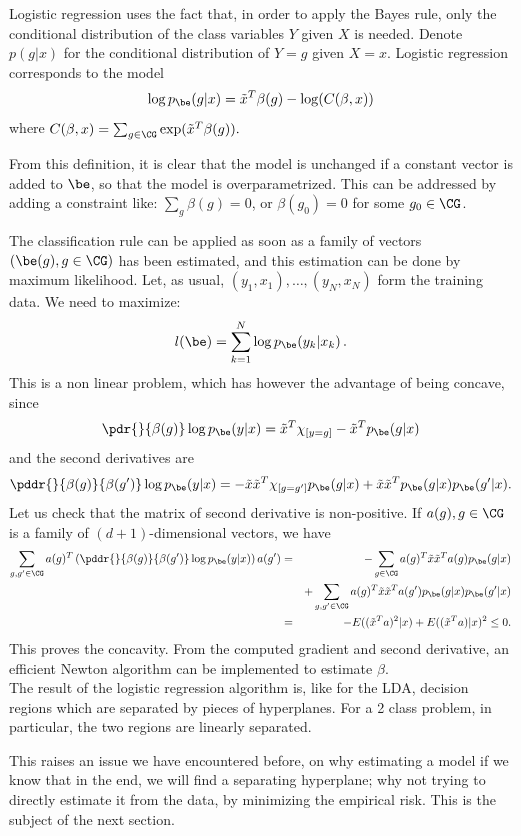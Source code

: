Logistic regression uses the fact that, in order to apply the Bayes
rule, only the conditional distribution of the class variables $Y$
given $X$ is needed. Denote $p(g|x)$ for the conditional distribution
of $Y=g$ given $X=x$. Logistic regression corresponds to the model
$$
\log p_\be(g|x) = \tilde x^T \beta(g) - \log(C(\beta, x))
$$
where
$C(\beta, x) = \sum_{g\in \CG} \exp(\tilde x^T \beta(g)).$

From this definition, it is clear that the model is unchanged  if a constant vector is added
to $\be$, so that the model is overparametrized. This can be addressed
by adding a constraint like: $\sum_g
\beta(g) = 0$, or $\beta(g_0) = 0$ for some $g_0\in \CG$.

The classification rule can be applied as soon as a family of vectors $(\be(g),
g\in\CG)$ has been estimated, and this estimation can be done by maximum
likelihood. Let, as usual, $(y_1, x_1), \ldots, (y_N, x_N)$ form the
training data. We need to maximize:
$$
l(\be) = \sum_{k=1}^N \log p_\be(y_k|x_k)\,.
$$
This is a non linear problem, which has however the advantage of being
concave, since 
$$
\pdr{}{\beta(g)} \log p_\be(y|x) = \tilde x^T \chi_{[y=g]} - 
\tilde x^T p_\be(g|x)
$$
and the second derivatives are
$$
\pddr{}{\beta(g)}{\beta(g')} \log p_\be(y|x) = -\tilde x \tilde x^T
\chi_{[g=g']} p_\be(g|x) + 
\tilde x \tilde x^T p_\be(g|x) p_\be(g'|x).
$$
Let us check that the matrix of second derivative is non-positive. If
$a(g), g\in\CG$ is a family of $(d+1)$-dimensional vectors,  we have
\begin{eqnarray*}
\sum_{g,g'\in\CG} a(g)^T\left(\pddr{}{\beta(g)}{\beta(g')} \log
p_\be(y|x)\right)a(g') &=& -\sum_{g\in\CG} a(g)^T \tilde x \tilde x^T a(g)
p_\be(g|x)  \\
&& + \sum_{g,g'\in\CG} a(g)^T \tilde x \tilde x^T a(g') p_\be(g|x)
p_\be(g'|x)\\
&=& -E((\tilde x^T a)^2|x) + E((\tilde x^T a)|x)^2 \leq 0.
\end{eqnarray*}
This proves the concavity. From the computed gradient and second
derivative, an efficient Newton algorithm can be implemented to
estimate $\beta$.
\\

The result of the logistic regression algorithm is, like for the LDA,
decision regions which are separated by pieces of  hyperplanes. For a
2 class problem, in particular, the two regions are linearly
separated.

This raises an issue we have encountered before, on why estimating a
model if we know that in the end, we will find a
separating hyperplane; why not trying to directly estimate it from the
data, by minimizing the empirical risk. This is the subject of the
next section.


